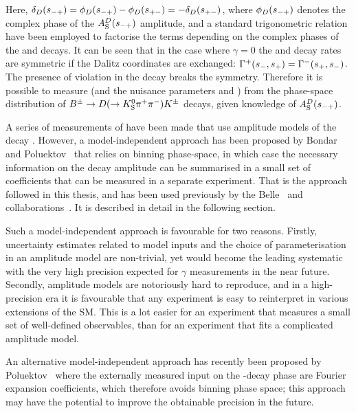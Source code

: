 Here, $\delta_{D}(s_{-+}) = \phi_D(s_{-+}) - \phi_D(s_{+-}) = - \delta_D(s_{+-})$, where $\phi_D(s_{-+})$ denotes the complex phase of the $A_{\rm S}^{D}(s_{-+})$ amplitude, and a standard trigonometric relation have been employed to factorise the terms depending on the complex phases of the \B and \D decays. It can be seen that in the case where $\gamma=0$ the \Bp and \Bm decay rates are symmetric if the Dalitz coordinates are exchanged: $\Gamma^+(s_-, s_+)=\Gamma^-(s_+, s_-)$. The presence of \CP violation in the \B decay breaks the symmetry. Therefore it is possible to measure \g (and the nuisance parameters \rB and \dB) from the phase-space distribution of ${{B}^\pm}\rightarrow{\ensuremath{D}}(\rightarrow{\ensuremath{{K}^0_{\mathrm{S}}}} \pi^+ \pi^-){{K}^\pm}$ decays, given knowledge of $A_{\rm S}^{D}(s_{-+})$.

A series of measurements of \g have been made that use amplitude models of the \D decay \cite{BABAR2005,BABAR2008,BABAR2010, BELLE2004,BELLE2006,BELLE2010,LHCb-PAPER-2014-017,LHCb-PAPER-2016-007}. However, 
a model-independent approach has been proposed by Bondar and Poluektov~\cite{bondarFeasibilityStudyModelindependent2006,bondarUseQuantumcorrelatedD02008} that relies on binning phase-space, in which case the necessary information on the \D decay amplitude can be summarised in a small set of coefficients that can be measured in a separate experiment. That is the approach followed in this thesis, and has been used previously by the Belle~\cite{BELLEMODIND} and \lhcb collaborations~\cite{LHCb-PAPER-2012-027}. It is described in detail in the following section.

Such a model-independent approach is favourable for two reasons. Firstly, uncertainty estimates related to model inputs and the choice of parameterisation in an amplitude model are non-trivial, yet would become the leading systematic with the very high precision expected for $\gamma$ measurements in the near future. Secondly, amplitude models are notoriously hard to reproduce, and in a high-precision era it is favourable that any experiment is easy to reinterpret in various extensions of the SM. This is a lot easier for an experiment that measures a small set of well-defined observables, than for an experiment that fits a complicated amplitude model.

An alternative model-independent approach has recently been proposed by Poluektov~\cite{} where the externally measured input on the \D-decay phase are Fourier expansion coefficients, which therefore avoids binning phase space; this approach may have the potential to improve the obtainable precision in the future.

